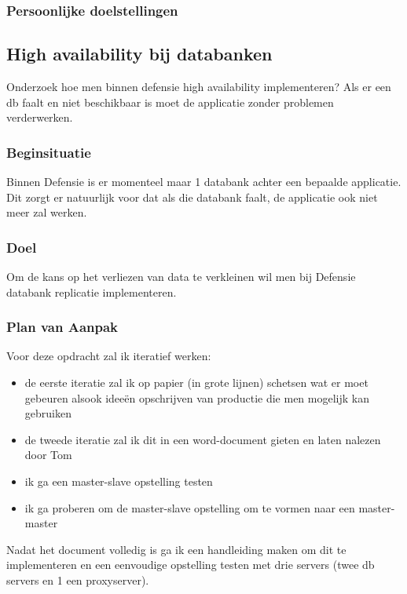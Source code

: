 \subsubsection{Persoonlijke doelstellingen}

\subsection{High availability bij databanken}


Onderzoek hoe men binnen defensie high availability implementeren? Als er een db faalt en niet beschikbaar is moet de applicatie zonder problemen verderwerken.

\subsubsection{Beginsituatie}

Binnen Defensie is er momenteel maar 1 databank achter een bepaalde applicatie. Dit zorgt er natuurlijk voor dat als die databank faalt, de applicatie ook niet meer zal werken.

\subsubsection{Doel}

Om de kans op het verliezen van data te verkleinen wil men bij Defensie databank replicatie implementeren.

\subsubsection{Plan van Aanpak}

Voor deze opdracht zal ik iteratief werken:

\begin{itemize}
    \item de eerste iteratie zal ik op papier (in grote lijnen) schetsen wat er moet gebeuren alsook ideeën opschrijven van productie die men mogelijk kan gebruiken
    \item de tweede iteratie zal ik dit in een word-document gieten en laten nalezen door Tom
    \item ik ga een master-slave opstelling testen
    \item ik ga proberen om de master-slave opstelling om te vormen naar een master-master
\end{itemize}

Nadat het document volledig is ga ik een handleiding maken om dit te implementeren en een eenvoudige opstelling testen met drie servers (twee \gls{db} servers en 1 een proxyserver).

